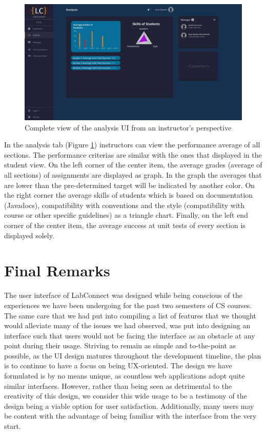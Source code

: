 \documentclass[a4paper, 12pt]{article}
\begin{document}
    \begin{figure}[H]
        \centering
        \includegraphics[width=\textwidth]{instructor_analysis}
        \caption{Complete view of the analysis UI from an instructor's perspective}
        \label{fig:instructor_analysis_full}
    \end{figure}

    In the analysis tab (Figure \ref{fig:instructor_analysis_full}) instructors can view the performance average of all sections. The performance criterias are similar with the ones that displayed in the student view.
    On the left corner of the center item, the average grades (average of all sections) of assignments are displayed as graph. In the graph the averages that are lower than the 
    pre-determined target will be indicated by another color. On the right corner the average skills of students which is based on documentation (Javadocs), compatibility with 
    conventions and the style (compatibility with course or other specific guidelines) as a triangle chart. Finally, on the left end corner of the center item, the average 
    success at unit tests of every section is displayed solely. 
    
    
    \pagebreak
    
    \section{Final Remarks}
    
    The user interface of LabConnect was designed while being conscious of the experiences we have been undergoing for the past two semesters of CS courses.
    The same care that we had put into compiling a list of features that we thought would alleviate many of the issues we had observed,
    was put into designing an interface such that users would not be facing the interface as an obstacle at any point during their usage.
    Striving to remain as simple and to-the-point as possible, as the UI design matures throughout the development timeline, the plan is
    to continue to have a focus on being UX-oriented. The design we have formulated is by no means unique, as countless web applications adopt 
    quite similar interfaces. However, rather than being seen as detrimental to the creativity of this design, we consider this wide usage 
    to be a testimony of the design being a viable option for user satisfaction. Additionally, many users may be content with the advantage of
    being familiar with the interface from the very start. 
    
\end{document}
